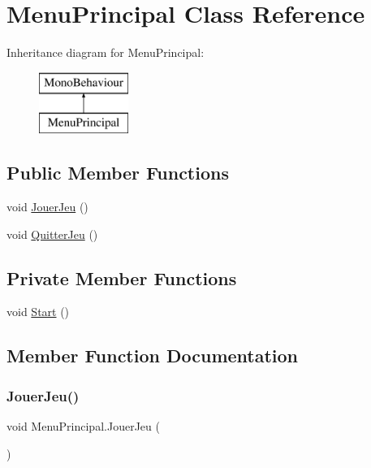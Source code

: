 \hypertarget{class_menu_principal}{}\section{Menu\+Principal Class Reference}
\label{class_menu_principal}
Inheritance diagram for Menu\+Principal\+:\begin{figure}[H]
\begin{center}
\leavevmode
\includegraphics[height=2.000000cm]{class_menu_principal}
\end{center}
\end{figure}
\subsection*{Public Member Functions}
\begin{DoxyCompactItemize}
\item 
void \mbox{\hyperlink{class_menu_principal_aa907deab9a136cca6ca4e6de4570c3b3}{Jouer\+Jeu}} ()
\item 
void \mbox{\hyperlink{class_menu_principal_aeac0d5acdbe491c5f4908cda0be06e01}{Quitter\+Jeu}} ()
\end{DoxyCompactItemize}
\subsection*{Private Member Functions}
\begin{DoxyCompactItemize}
\item 
void \mbox{\hyperlink{class_menu_principal_a00be0527421c80f5386b0d34f1fff1e3}{Start}} ()
\end{DoxyCompactItemize}


\subsection{Member Function Documentation}
\mbox{\label{class_menu_principal_aa907deab9a136cca6ca4e6de4570c3b3}} 
\subsubsection{\texorpdfstring{Jouer\+Jeu()}{JouerJeu()}}
{\footnotesize\ttfamily void Menu\+Principal.\+Jouer\+Jeu (\begin{DoxyParamCaption}{ }\end{DoxyParamCaption})\hspace{0.3cm}{\ttfamily [inline]}}

